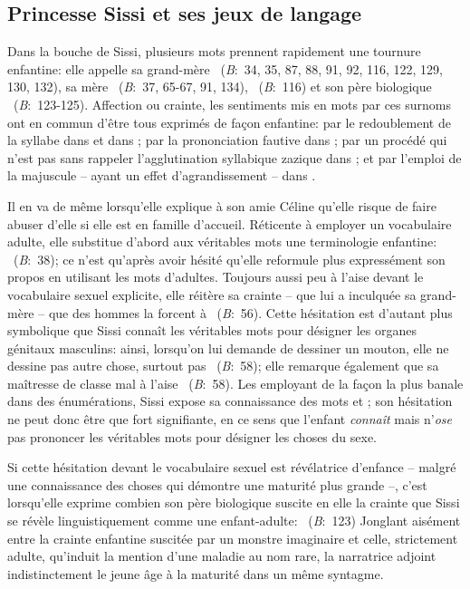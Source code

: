\subsection{Princesse Sissi et ses jeux de langage}
Dans la bouche de Sissi, plusieurs mots prennent rapidement une tournure enfantine: elle appelle sa grand-mère ~(\textit{B}:~34, 35, 87, 88, 91, 92, 116, 122, 129, 130, 132), sa mère ~(\textit{B}:~37, 65-67, 91, 134), ~(\textit{B}:~116) et son père biologique ~(\textit{B}:~123-125).
Affection ou crainte, les sentiments mis en mots par ces surnoms ont en commun d'être tous exprimés de façon enfantine: par le redoublement de la syllabe dans  et dans ; par la prononciation fautive dans ; par un procédé qui n'est pas sans rappeler l'agglutination syllabique zazique dans ; et par l'emploi de la majuscule -- ayant un effet d'agrandissement -- dans .
\par
Il en va de même lorsqu'elle explique à son amie Céline qu'elle risque de faire abuser d'elle si elle est  en famille d'accueil.
Réticente à employer un vocabulaire adulte, elle substitue d'abord aux véritables mots une terminologie enfantine: ~(\textit{B}:~38); ce n'est qu'après avoir hésité qu'elle reformule plus expressément son propos en utilisant les mots d'adultes.
Toujours aussi peu à l'aise devant le vocabulaire sexuel explicite, elle réitère sa crainte -- que lui a inculquée sa grand-mère -- que des hommes la forcent à ~(\textit{B}:~56).
Cette hésitation est d'autant plus symbolique que Sissi connaît les véritables mots pour désigner les organes génitaux masculins: ainsi, lorsqu'on lui demande de dessiner un mouton, elle ne dessine pas autre chose, surtout pas ~(\textit{B}:~58); elle remarque également que sa maîtresse de classe mal à l'aise ~(\textit{B}:~58).
Les employant de la façon la plus banale dans des énumérations, Sissi expose sa connaissance des mots  et ; son hésitation ne peut donc être que fort signifiante, en ce sens que l'enfant \textit{connaît} mais n'\textit{ose} pas prononcer les véritables mots pour désigner les choses du sexe.
\par
Si cette hésitation devant le vocabulaire sexuel est révélatrice d'enfance -- malgré une connaissance des choses qui démontre une maturité plus grande --, c'est lorsqu'elle exprime combien son père biologique suscite en elle la crainte que Sissi se révèle linguistiquement comme une enfant-adulte: ~(\textit{B}:~123)
Jonglant aisément entre la crainte enfantine suscitée par un monstre imaginaire et celle, strictement adulte, qu'induit la mention d'une maladie au nom rare, la narratrice adjoint indistinctement le jeune âge à la maturité dans un même syntagme.

